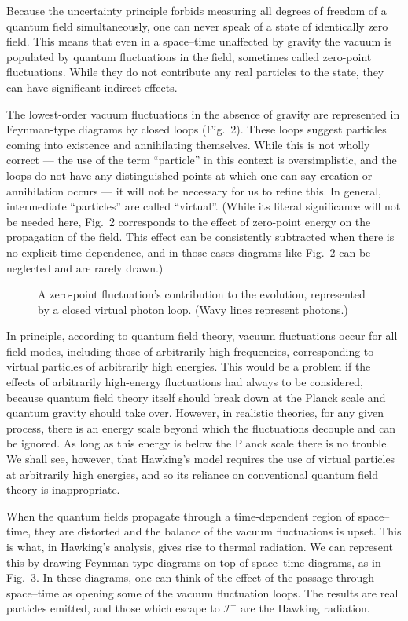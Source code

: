 \documentclass[11pt]{article}
\def\scrif{{\mathcal I}^+}
\begin{document}
Because the uncertainty principle forbids measuring all degrees of freedom of a
quantum field simultaneously, one can never speak of a state of identically
zero field.  This means that even in a space--time unaffected by gravity the
vacuum is populated by quantum fluctuations in the field, sometimes called
zero-point fluctuations.  While they do not contribute any real particles to
the state, they can have significant indirect effects.

The lowest-order vacuum fluctuations in the absence of gravity are represented
in Feynman-type  diagrams by closed loops (Fig.~2).  These loops suggest
particles coming into existence and annihilating themselves.  While this is not
wholly correct --- the use of the term ``particle'' in this context is
oversimplistic, and the loops do not have any distinguished points at which one
can say creation or annihilation occurs --- it will not be necessary for us to
refine this.  In general, intermediate ``particles'' are called ``virtual''.
(While its literal significance will not be needed here, Fig.~2 corresponds to
the effect of zero-point energy  on the propagation of the field.  This effect
can be consistently subtracted when there is no explicit time-dependence, and
in those cases diagrams like Fig.~2 can  be neglected and are rarely drawn.)

\begin{figure}
\epsfxsize=1in
\caption{A zero-point fluctuation's contribution to the evolution,
represented by a closed virtual photon loop. (Wavy lines represent photons.)
}
\end{figure}

In principle, according to quantum field theory, vacuum fluctuations occur for
all field modes, including those of arbitrarily high frequencies, corresponding
to virtual particles of arbitrarily high energies.    This would be a problem
if the effects of arbitrarily high-energy fluctuations had always to be
considered, because quantum field theory itself should break down at the Planck
scale and quantum gravity should take over.  However, in realistic
theories, for any given process, there is an energy scale beyond which
the fluctuations decouple and can be ignored.  As long as this energy
is below the Planck scale there is no trouble.
We shall see, however, that Hawking's model requires the use of virtual
particles at arbitrarily high energies, and so its reliance on conventional
quantum field theory is inappropriate.


When the quantum fields propagate through a time-dependent region of
space--time, they are distorted and the balance of the vacuum fluctuations is
upset.  This is what, in Hawking's analysis, gives rise to thermal radiation. 
We can represent this by drawing Feynman-type diagrams on top of space--time
diagrams, as in Fig.~3.  In these diagrams, one can think of the effect of the
passage through space--time as opening some of the vacuum fluctuation loops. 
The results are real particles emitted, and those which escape to $\scrif$ are
the Hawking radiation.  
\end{document}

